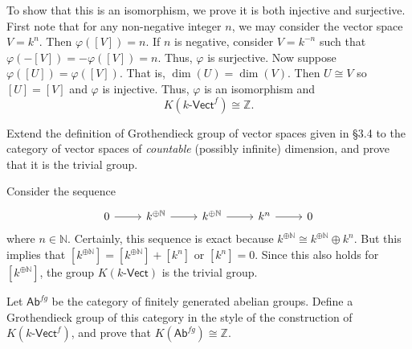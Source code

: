 \documentclass[../../master.tex]{subfiles}
\begin{document}
\begin{solution}
        To show that this is an isomorphism, we prove it is both injective and surjective.
        First note that for any non-negative integer $n$, we may consider the vector space $V = k^{n}$.
        Then $\varphi([V]) = n$.
        If $n$ is negative, consider $V = k^{-n}$ such that $\varphi(-[V]) = -\varphi([V]) = n$.
        Thus, $\varphi$ is surjective.
        Now suppose $\varphi([U]) = \varphi([V])$.
        That is, $\dim(U) = \dim(V)$.
        Then $U \cong V$ so $[U] = [V]$ and $\varphi$ is injective.
        Thus, $\varphi$ is an isomorphism and
        \[
            K(k\text{-}\mathsf{Vect}^{f}) \cong \mathbb{Z}.
        \]
\end{solution}

\begin{problem}
    Extend the definition of Grothendieck group of vector spaces given in \S 3.4 to the category of vector spaces of \textit{countable} (possibly infinite) dimension, and prove that it is the trivial group.
\end{problem}

\begin{solution}
    Consider the sequence
    \[
    \begin{tikzcd}
        0 & k^{\oplus \mathbb{N}} & k^{\oplus \mathbb{N}} & k^{n} & 0
        \arrow[from=1-1, to=1-2] 
        \arrow[from=1-2, to=1-3] 
        \arrow[from=1-3, to=1-4] 
        \arrow[from=1-4, to=1-5] 
    \end{tikzcd}
    \]
    where $n \in \mathbb{N}$.
    Certainly, this sequence is exact because $k^{\oplus \mathbb{N}} \cong k^{\oplus \mathbb{N}} \oplus k^{n}$.
    But this implies that $[k^{\oplus \mathbb{N}}] = [k^{\oplus \mathbb{N}}] + [k^{n}]$ or $[k^{n}] = 0$.
    Since this also holds for $[k^{\oplus \mathbb{N}}]$, the group $K(k\text{-}\mathsf{Vect})$ is the trivial group.
\end{solution}

\begin{problem}
    Let $\mathsf{Ab}^{fg}$ be the category of finitely generated abelian groups.
    Define a Grothendieck group of this category in the style of the construction of $K(k\text{-}\mathsf{Vect}^{f})$, and prove that $K(\mathsf{Ab}^{fg}) \cong \mathbb{Z}$.
\end{problem}
\end{document}
